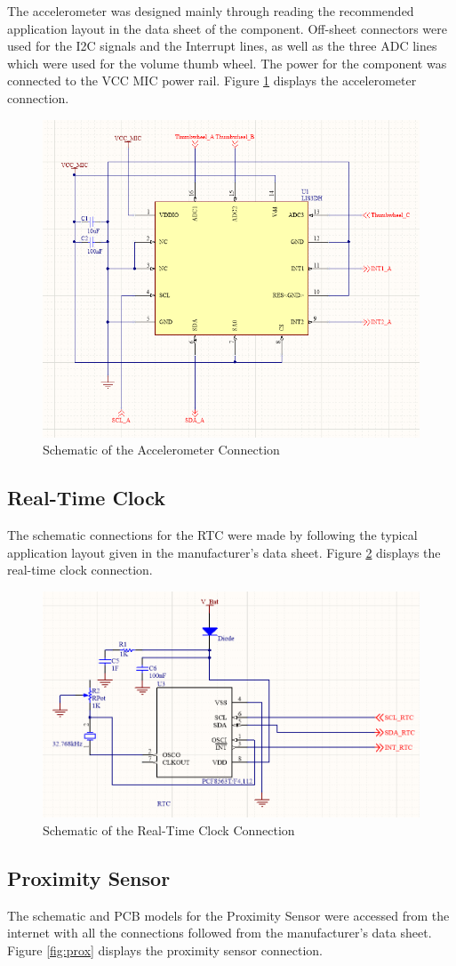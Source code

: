 	The accelerometer was designed mainly through reading the recommended application layout in the data sheet of the component. Off-sheet connectors were used for the I2C signals and the Interrupt lines, as well as the three ADC lines which were used for the volume thumb wheel. The power for the component was connected to the VCC MIC power rail.
Figure \ref{fig:a} displays the accelerometer connection. 

\begin{figure}
	\includegraphics[width=0.5\linewidth]{Figures/accelerometer.png}\centering
	\caption{Schematic of the Accelerometer Connection}
	\label{fig:a}
\end{figure}

\subsection{Real-Time Clock}
\label{chap:RTC}

	The schematic connections for the RTC were made by following the typical application layout given in the manufacturer's data sheet.
Figure \ref{fig:RTC} displays the real-time clock connection. 

\begin{figure}
	\includegraphics[width=0.5\linewidth]{Figures/RTC.png}\centering
	\caption{Schematic of the Real-Time Clock Connection}
	\label{fig:RTC}
\end{figure}

\subsection{Proximity Sensor}
\label{chap:prox}
	The schematic and PCB models for the Proximity Sensor were accessed from the internet with all the connections followed from the manufacturer's data sheet. 
Figure \ref{fig:prox} displays the proximity sensor connection. 

